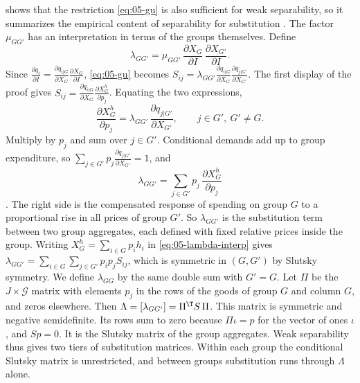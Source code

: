 \citet{Gorman1971} shows that the restriction \eqref{eq:05-gu} is also sufficient for weak separability,
so it summarizes the empirical content of separability for substitution
\citep[p.~129]{DeatonMuellbauer1980b}. The factor $\mu_{GG'}$ has an
interpretation in terms of the groups themselves. Define
\begin{equation}\label{eq:05-lambda-GG}
  \lambda_{GG'} = \mu_{GG'}\,\frac{\partial X_G}{\partial I}\,\frac{\partial X_{G'}}{\partial I}.
\end{equation}
Since $\frac{\partial q_i}{\partial I} = \frac{\partial q_{i|G}}{\partial X_G}\frac{\partial X_G}{\partial
I}$, \eqref{eq:05-gu} becomes $S_{ij} = \lambda_{GG'}\frac{\partial q_{i|G}}{\partial
X_G}\frac{\partial q_{j|G'}}{\partial X_{G'}}$. The first display of the proof gives $S_{ij} =
\frac{\partial q_{i|G}}{\partial X_G}\frac{\partial X_G^h}{\partial p_j}$. Equating the two expressions,
\begin{equation}\label{eq:05-XG-pj}
  \frac{\partial X_G^h}{\partial p_j} = \lambda_{GG'}\,\frac{\partial q_{j|G'}}{\partial X_{G'}},
  \qquad j \in G',\ G' \neq G .
\end{equation}
Multiply by $p_j$ and sum over $j \in G'$. Conditional demands add up to group expenditure, so $\sum_{j \in
G'} p_j\frac{\partial q_{j|G'}}{\partial X_{G'}} = 1$, and
\begin{equation}\label{eq:05-lambda-interp}
  \lambda_{GG'} = \sum_{j \in G'} p_j\,\frac{\partial X_G^h}{\partial p_j}
\end{equation}
\citep[\S 5.2, eq.~2.10, p.~129]{DeatonMuellbauer1980b}. The right side is the compensated response of
spending on group $G$ to a proportional rise in all prices of group $G'$. So $\lambda_{GG'}$ is the
substitution term between two group aggregates, each defined with fixed relative prices inside the group.
Writing $X_G^h = \sum_{i \in G} p_ih_i$ in \eqref{eq:05-lambda-interp} gives $\lambda_{GG'} = \sum_{i \in G}
\sum_{j \in G'} p_ip_jS_{ij}$, which is symmetric in $(G, G')$ by Slutsky symmetry. We define $\lambda_{GG}$
by the same double sum with $G' = G$. Let $\Pi$ be the $J \times \mathcal{G}$ matrix with elements $p_j$
in the rows of the goods of group $G$ and column $G$, and zeros elsewhere. Then $\Lambda = [\lambda_{GG'}]
= \Pi^{\T} S\,\Pi$. This matrix is symmetric and negative semidefinite. Its rows sum to zero because
$\Pi\iota = p$ for the vector of ones $\iota$, and $Sp = 0$. It is the Slutsky matrix of the group
aggregates. Weak separability thus gives
two tiers of substitution matrices. Within each group the conditional Slutsky matrix is unrestricted, and
between groups substitution runs through $\Lambda$ alone.

